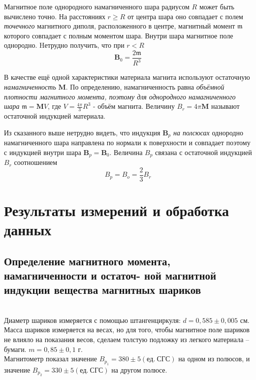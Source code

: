 Магнитное поле однородного намагниченного шара радиусом $R$ может быть вычислено точно. На расстояниях $r \geq R$ от центра шара оно совпадает с полем \textit{точечного} магнитного диполя, расположенного в центре, магнитный момент $\mathfrak{m}$ которого совпадает с полным моментом шара. Внутри шара магнитное поле однородно. Hетрудно получить, что при $r < R$ \[\textbf{B}_{0} = \frac{2\mathfrak{m}}{R^3}\]

В качестве ещё одной характеристики материала магнита используют остаточную \textit{намагниченность} $\textbf{M}$. По определению, намагниченность равна \textit{объёмной плотности магнитного момента, поэтому для однородного намагниченного шара} $\mathfrak{m}= \textbf{M}V $, где $V = \frac{4\pi}{3}R^3$ - объём магнита. Величину $B_r = 4\pi \textbf{M}$ называют остаточной индукцией материала.

Из сказанного выше нетрудно видеть, что индукция $\textbf{B}_p$ \textit{на полсюсах} однородно намагниченного шара направлена по нормали к поверхности и совпадает поэтому с индукцией внутри шара $\textbf{B}_p = \textbf{B}_0$. Величина $B_p$ связана с остаточной индукцией $B_r$ соотношением \[B_p = B_o = \frac{2}{3}B_r \]

\section{Результаты измерений и обработка данных}
\subsection{Определение магнитного момента, намагниченности и остаточ- ной магнитной индукции вещества магнитных шариков}\\

Диаметр шариков измеряется с помощью штангенциркуля: $d = 0,585 \pm 0,005 $ см. \\
Масса шариков измеряется на весах, но для того, чтобы магнитное поле шариков не влияло на показания весов, сделаем толстую подложку из легкого материала -- бумаги. $m = 0,85 \pm 0,1 $ г. \\
Магнитометр показал значение $B_{p_1} = 380 \pm 5 (ед. \ СГС)$ на одном из полюсов, и значение $B_{p_2} = 330 \pm 5 (ед. \ СГС)$ на другом полюсе. 


